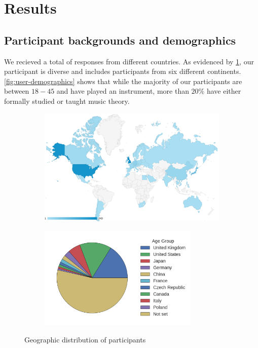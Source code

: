 \section{Results}

\subsection{Participant backgrounds and demographics}

We recieved a total of  responses from  different countries. As evidenced by \cref{fig:user-geographics},
our participant is diverse and includes participants from six different continents.
\cref{fig:user-demographics} shows that while the majority of our participants
are between $18-45$ and have played an instrument, more than $20\%$
have either formally studied or taught music theory.

\begin{figure}[htpb]
  \centering
  \begin{subfigure}[b]{0.98\textwidth}
    \centering
    \includegraphics[width=0.85\linewidth]{participants-by-country.png}
  \end{subfigure}
  \begin{subfigure}[c]{0.55\textwidth}
    \centering
    \hspace{-1cm}\includegraphics[width=3in]{user-demographics-pie.png}
  \end{subfigure}
  \begin{subfigure}[c]{0.44\textwidth}
    \centering
    
  \end{subfigure}
  \caption{Geographic distribution of participants}
  \label{fig:user-geographics}
\end{figure}

